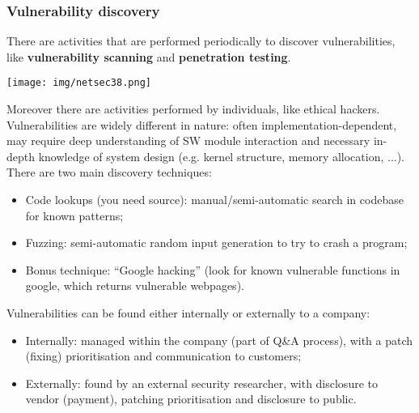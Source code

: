 \documentclass[a4paper, 10pt, titlepage]{article}
\begin{document}
\subsubsection*{Vulnerability discovery}
There are activities that are performed periodically to discover vulnerabilities, like \textbf{vulnerability scanning} and \textbf{penetration testing}.
\begin{center}
	\texttt{[image: img/netsec38.png]}
\end{center}
Moreover there are activities performed by individuals, like ethical hackers. \\
Vulnerabilities are widely different in nature: often implementation-dependent, may require deep understanding of SW module interaction and necessary in-depth knowledge of system design (e.g. kernel structure, memory allocation, ...).
There are two main discovery techniques:
\begin{itemize}
	\item Code lookups (you need source): manual/semi-automatic search in codebase for known patterns;
	\item Fuzzing: semi-automatic random input generation to try to crash a program;
	\item Bonus technique: “Google hacking” (look for known vulnerable functions in google, which returns vulnerable webpages).
\end{itemize}
Vulnerabilities can be found either internally or externally to a company:
\begin{itemize}
	\item Internally: managed within the company (part of
	Q\&A process), with a patch (fixing) prioritisation and communication to customers;
	\item Externally: found by an external security researcher, with disclosure to vendor (payment), patching prioritisation and disclosure to public.
\end{itemize}
\end{document}
